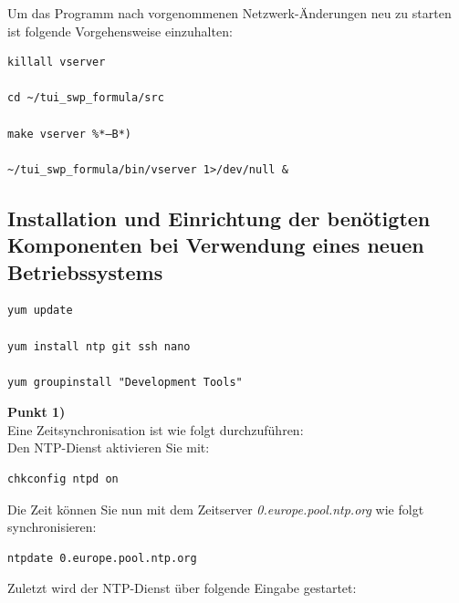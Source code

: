 \documentclass[fontsize = 12pt, paper = a4]{scrreprt}
\begin{document}
Um das Programm nach vorgenommenen Netzwerk-Änderungen neu zu starten ist folgende Vorgehensweise einzuhalten:

\vspace*{4mm}
\begin{lstlisting}[frame=single]
killall vserver

cd ~/tui_swp_formula/src
	
make vserver %*–B*)

~/tui_swp_formula/bin/vserver 1>/dev/null &
\end{lstlisting} 
\vspace*{-2mm}

\newpage

\subsection{Installation und Einrichtung der benötigten Komponenten bei Verwendung eines neuen Betriebssystems}

\vspace*{4mm}
\begin{lstlisting}[frame=single]
yum update

yum install ntp git ssh nano

yum groupinstall "Development Tools"
\end{lstlisting} 
\vspace*{-2mm}

\textbf{Punkt 1)} \\

Eine Zeitsynchronisation ist wie folgt durchzuführen: \\
Den NTP-Dienst aktivieren Sie mit: 

\vspace*{4mm}
\begin{lstlisting}[frame=single]
chkconfig ntpd on
\end{lstlisting} 
\vspace*{-2mm}


Die Zeit können Sie nun mit dem Zeitserver \textit{0.europe.pool.ntp.org} wie folgt synchronisieren:

\vspace*{4mm}
\begin{lstlisting}[frame=single]
ntpdate 0.europe.pool.ntp.org
\end{lstlisting} 
\vspace*{-2mm}

Zuletzt wird der NTP-Dienst über folgende Eingabe gestartet: 
\end{document}
